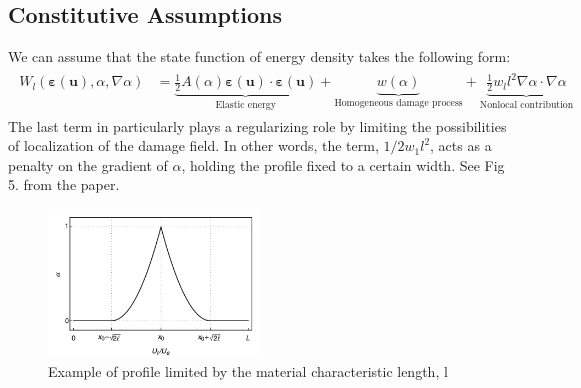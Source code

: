 \documentclass[12pt,3p]{article}
\numberwithin{equation}{section}
\begin{document}
\subsection{Constitutive Assumptions}
We can assume that the state function of energy density takes the following form:
\begin{align}\label{EnergyDensity}
\begin{split}
W_l (\boldsymbol{\varepsilon} (\mathbf{u}), \alpha, \nabla \alpha) &= \underbrace{ \frac{1}{2} A (\alpha) \boldsymbol{\varepsilon} (\mathbf{u}) \cdot \boldsymbol{\varepsilon} (\mathbf{u})}_\text{Elastic energy} + \underbrace{w (\alpha)}_\text{Homogeneous damage process} + \underbrace{\frac{1}{2} w_l l^2 \nabla \alpha \cdot \nabla \alpha}_\text{Nonlocal contribution}	
\end{split}
\end{align}
The last term in particularly plays a regularizing role by limiting the possibilities of localization of the damage field. In other words, the term, $1/2 w_1 l^2$, acts as a penalty on the gradient of $\alpha$, holding the profile fixed to a certain width. See Fig 5. from the paper. 
\begin{figure}[h]
    \centering
    \includegraphics[width=0.5\textwidth]{Images/Fig5.png}
    \caption{Example of profile limited by the material characteristic length, l}
\end{figure}
\end{document}

